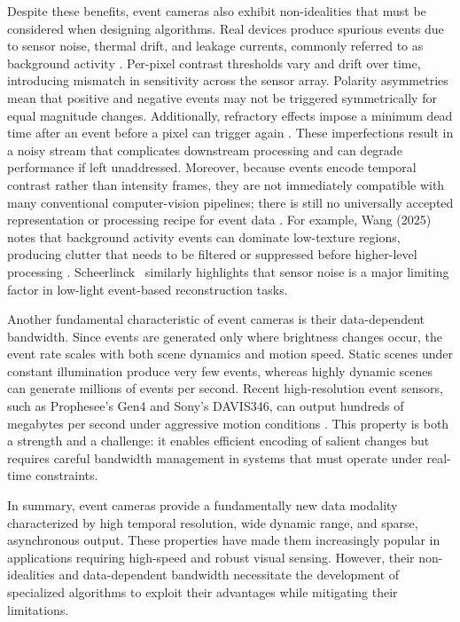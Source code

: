 Despite these benefits, event cameras also exhibit non-idealities that must be considered when designing algorithms. Real devices produce spurious events due to sensor noise, thermal drift, and leakage currents, commonly referred to as background activity \cite{Gallego2020Survey}. Per-pixel contrast thresholds vary and drift over time, introducing mismatch in sensitivity across the sensor array. Polarity asymmetries mean that positive and negative events may not be triggered symmetrically for equal magnitude changes. Additionally, refractory effects impose a minimum dead time after an event before a pixel can trigger again \cite{Delbruck2020Handbook}. These imperfections result in a noisy stream that complicates downstream processing and can degrade performance if left unaddressed. Moreover, because events encode temporal contrast rather than intensity frames, they are not immediately compatible with many conventional computer-vision pipelines; there is still no universally accepted representation or processing recipe for event data \cite{Gallego2020Survey}. For example, Wang (2025) notes that background activity events can dominate low-texture regions, producing clutter that needs to be filtered or suppressed before higher-level processing \cite{Wang2025Thesis}. Scheerlinck~\cite{Scheerlinck2021Thesis} similarly highlights that sensor noise is a major limiting factor in low-light event-based reconstruction tasks.

Another fundamental characteristic of event cameras is their data-dependent bandwidth. Since events are generated only where brightness changes occur, the event rate scales with both scene dynamics and motion speed. Static scenes under constant illumination produce very few events, whereas highly dynamic scenes can generate millions of events per second. Recent high-resolution event sensors, such as Prophesee’s Gen4 and Sony’s DAVIS346, can output hundreds of megabytes per second under aggressive motion conditions \cite{Finateu2020ISSCC}. This property is both a strength and a challenge: it enables efficient encoding of salient changes but requires careful bandwidth management in systems that must operate under real-time constraints.

In summary, event cameras provide a fundamentally new data modality characterized by high temporal resolution, wide dynamic range, and sparse, asynchronous output. These properties have made them increasingly popular in applications requiring high-speed and robust visual sensing. However, their non-idealities and data-dependent bandwidth necessitate the development of specialized algorithms to exploit their advantages while mitigating their limitations.

